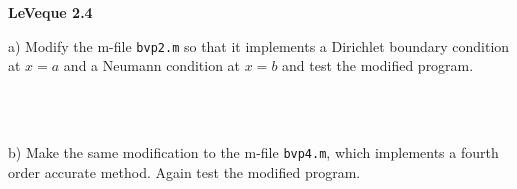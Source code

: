\textbf{LeVeque 2.4} 

a) Modify the m-file \texttt{bvp2.m} so that it implements a Dirichlet boundary condition at $x = a$ and a Neumann
   condition at $x = b$ and test the modified program.

\begin{solution}\ \\\\
\end{solution}

\pagebreak
b) Make the same modification to the m-file \texttt{bvp4.m}, which implements a fourth order accurate method. Again test
   the modified program.

\begin{solution}\ \\\\
\end{solution}